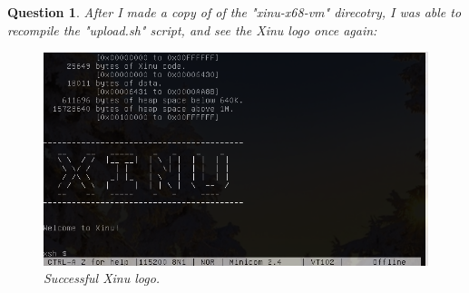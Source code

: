 \documentclass{article}
\newtheorem{theorem}{Question}
\begin{document}
\begin{theorem}
After I made a copy of of the "xinu-x68-vm" direcotry, I was able to recompile the "upload.sh" script, and see the 
Xinu logo once again:
\begin{figure}[ht!]
  \includegraphics[width=\textwidth]{xinu2.png}
  \caption{Successful Xinu logo.}
\end{figure}
\end{theorem}
\end{document}
